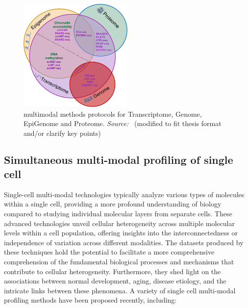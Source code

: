 \begin{figure}[!ht]
	\centering
	\includegraphics[width=0.50\textwidth]{multi-model-methods/fig}
	\vspace{0.1cm}
	\caption[multimodal methods protocols for Transcriptome, Genome, EpiGenome and Proteome]{multimodal methods protocols for Transcriptome, Genome, EpiGenome and Proteome. \emph{Source:~\cite{lee2020single}} (modified to fit thesis format and/or clarify key points)}
	\label{fig:piechart-mulitmodal-methods}
\end{figure}



\subsection{Simultaneous multi-modal profiling of single cell}
\label{background:sec1:mulitmodal}
Single-cell multi-modal technologies typically analyze various types of molecules within a single cell, providing a more profound understanding of biology compared to studying individual molecular layers from separate cells. These advanced technologies unveil cellular heterogeneity across multiple molecular levels within a cell population, offering insights into the interconnectedness or independence of variation across different modalities. The datasets produced by these techniques hold the potential to facilitate a more comprehensive comprehension of the fundamental biological processes and mechanisms that contribute to cellular heterogeneity. Furthermore, they shed light on the associations between normal development, aging, disease etiology, and the intricate links between these phenomena. A variety of single cell multi-modal profiling methods have been proposed recently, including:

